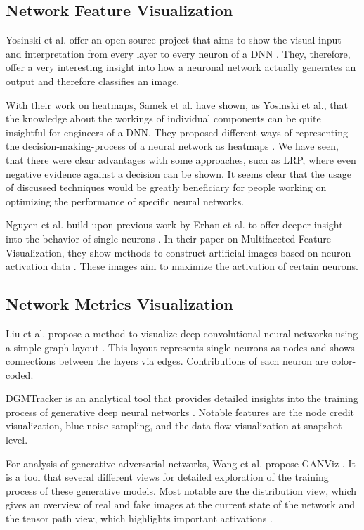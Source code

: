 \documentclass{acmsiggraph}               %
\begin{document}
\subsection{Network Feature Visualization}

Yosinski et al. offer an open-source project that aims to show the visual input and interpretation from every layer to every neuron of a DNN \cite{Yosinski2015}. They, therefore, offer a very interesting insight into how a neuronal network actually generates an output and therefore classifies an image.

With their work on heatmaps, Samek et al. have shown, as Yosinski et al., that the knowledge about the workings of individual components can be quite insightful for engineers of a DNN. They proposed different ways of representing the decision-making-process of a neural network as heatmaps \cite{Samek2017}. We have seen, that there were clear advantages with some approaches, such as LRP, where even negative evidence against a decision can be shown. It seems clear that the usage of discussed techniques would be greatly beneficiary for people working on optimizing the performance of specific neural networks.

Nguyen et al. build upon previous work by Erhan et al. to offer deeper insight into the behavior of single neurons \cite{Nguyen2016,Erhan2009}. In their paper on Multifaceted Feature Visualization, they show methods to construct artificial images based on neuron activation data \cite{Nguyen2016}. These images aim to maximize the activation of certain neurons.

\subsection{Network Metrics Visualization}
Liu et al. propose a method to visualize deep convolutional neural networks using a simple graph layout \cite{Liu2016}. This layout represents single neurons as nodes and shows connections between the layers via edges. Contributions of each neuron are color-coded.

DGMTracker is an analytical tool that provides detailed insights into the training process of generative deep neural networks \cite{Liu2018}. Notable features are the node credit visualization, blue-noise sampling, and the data flow visualization at snapshot level.

For analysis of generative adversarial networks, Wang et al. propose GANViz \cite{Wang}. It is a tool that several different views for detailed exploration of the training process of these generative models. Most notable are the distribution view, which gives an overview of real and fake images at the current state of the network and the tensor path view, which highlights important activations \cite{Wang}.
\end{document}

